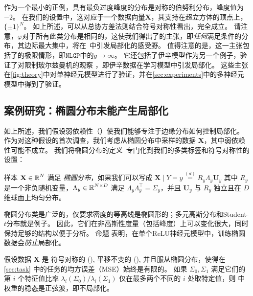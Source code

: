 作为一个最小的正例，具有最负过度峰度的分布是对称的伯努利分布，峰度值为$-2$。
在我们的设置中，这对应于一个数据向量$\mathbf{X}$，其支持在超立方体的顶点上，$\{ \pm 1 \}^N$。
如上所述，可以从总协方差法则结合符号对称性看出，完全成立。
请注意，$\varphi$对于所有此类分布是相同的，这使我们得出了的主张，即\emph{任何}满足条件的分布，其边际最大集中，将在~中引发局部化的感受野。
值得注意的是，这一主张包括了\textcite{ingrosso2022data}的极限情形，即$\texttt{NLGP}$中的$g\to\infty$。
它还包括了伊辛模型作为另一个例子，验证了对限制玻尔兹曼机的观察 \cite{harsh2020placecell}，即伊辛数据在学习模型中引发局部化。
这些主张在\cref{fig:theory}中对单神经元模型进行了验证，并在\cref{sec:experiments}中的多神经元模型中得到了验证。
\subsection{案例研究：椭圆分布未能产生局部化}
\label{sub:elliptical}

如上所述，我们假设弱依赖性（）使我们能够专注于边缘分布如何控制局部化。
作为对这种假设的首次调查，我们考虑从椭圆分布中采样的数据 $\mathbf{X}$，其中弱依赖性可能不成立。
我们将椭圆分布的定义~\parencite{frahm2004generalized}专门化到我们的多类标签和符号对称性的设置：
\begin{definition}
    \label{def:elliptical}
    样本 $\mathbf{X} \in \operatorname{\mathbb{R}}^N$ 满足 \emph{椭圆分布}，如果我们可以写成
    $\mathbf{X} \mid Y = y \overset{(d)}{=} R_y \Lambda_y \mathbf{U}_y$
    其中 $R_y$ 是一个非负随机变量，$\Lambda_y \in \operatorname{\mathbb{R}}^{N \times D}$ 满足 $\Lambda_y \Lambda_y^\top = \Sigma_y$，并且 $\mathbf{U}_y$ 与 $R_y$ 独立且在 $D$ 维球面上均匀分布。
\end{definition}

椭圆分布类是广泛的，仅要求密度的等高线是椭圆形的；多元高斯分布和Student-$t$分布就是例子。
因此，它们在非高斯性度量（包括峰度）上可以变化很大，同时保持足够的结构以便于分析。
命题  表明，在单个ReLU神经元模型中，训练椭圆数据会\emph{防止}局部化。
\begin{proposition} \label{thm:elliptical}
  假设数据 $\mathbf{X}$ 是
  符号对称的 (),
  平移不变的 (),
  并且服从椭圆分布，使得在 \cref{sec:task} 中的任务的均方误差（MSE）始终是有限的。
  如果 $\Sigma_0, \Sigma_1$ 满足它们的第 $i$ 个特征值比率 $\lambda_i(\Sigma_0) / \lambda_i(\Sigma_1)$ 仅在最多两个不同的 $i$ 处取特定值，则  中权重的稳态是正弦波，即不局部化。
\end{proposition}

